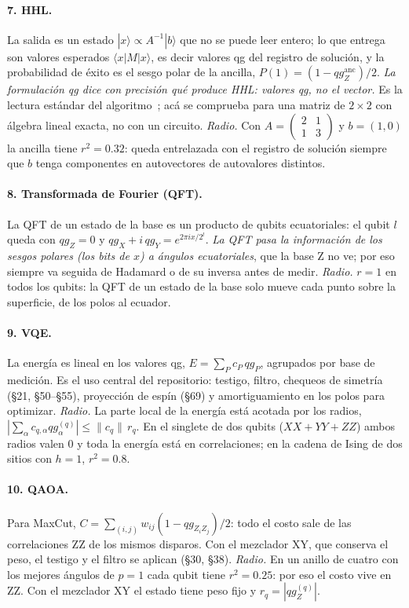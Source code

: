 \documentclass[11pt]{article}
\newcommand{\q}[1]{qg_{#1}}
\newcommand{\qZ}{qg_Z}
\newcommand{\qX}{qg_X}
\newcommand{\qY}{qg_Y}
\begin{document}
\paragraph{7. HHL.} La salida es un estado $|x\rangle\propto A^{-1}|b\rangle$ que no se puede leer entero; lo
que entrega son valores esperados $\langle x|M|x\rangle$, es decir valores qg del registro de solución, y la
probabilidad de éxito es el sesgo polar de la ancilla, $P(1)=(1-\qZ^{\mathrm{anc}})/2$. \emph{La formulación qg
dice con precisión qué produce HHL: valores qg, no el vector.} Es la lectura estándar del algoritmo~\cite{nielsen2010quantum}; acá se
comprueba para una matriz de $2\times2$ con álgebra lineal exacta, no con un circuito. \emph{Radio.} Con
$A=\begin{pmatrix}2&1\\1&3\end{pmatrix}$ y $b=(1,0)$ la ancilla tiene $r^2=0.32$: queda entrelazada con el registro
de solución siempre que $b$ tenga componentes en autovectores de autovalores distintos.

\paragraph{8. Transformada de Fourier (QFT).} La QFT de un estado de la base es un producto de qubits
ecuatoriales: el qubit $l$ queda con $\qZ=0$ y $\qX+i\,\qY=e^{2\pi i x/2^l}$. \emph{La QFT pasa la
información de los sesgos polares (los bits de $x$) a ángulos ecuatoriales}, que la base Z no ve; por eso
siempre va seguida de Hadamard o de su inversa antes de medir. \emph{Radio.} $r=1$ en todos los qubits: la QFT de
un estado de la base solo mueve cada punto sobre la superficie, de los polos al ecuador.

\paragraph{9. VQE.} La energía es lineal en los valores qg, $E=\sum_P c_P\,\q{P}$, agrupados por base de
medición. Es el uso central del repositorio: testigo, filtro, chequeos de simetría (§21, §50--§55), proyección
de espín (§69) y amortiguamiento en los polos para optimizar. \emph{Radio.} La parte local de la energía está acotada por
los radios, $|\sum_\alpha c_{q,\alpha}\q{\alpha}^{(q)}|\le\|c_q\|\,r_q$. En el singlete de dos qubits ($XX+YY+ZZ$)
ambos radios valen 0 y toda la energía está en correlaciones; en la cadena de Ising de dos sitios con $h=1$,
$r^2=0.8$.

\paragraph{10. QAOA.} Para MaxCut, $C=\sum_{(i,j)}w_{ij}(1-\q{Z_iZ_j})/2$: todo el costo sale de las
correlaciones ZZ de los mismos disparos. Con el mezclador XY, que conserva el peso, el testigo y el filtro
se aplican (§30, §38). \emph{Radio.} En un anillo de cuatro con los mejores ángulos de $p=1$ cada qubit tiene $r^2=0.25$:
por eso el costo vive en ZZ. Con el mezclador XY el estado tiene peso fijo y $r_q=|\qZ^{(q)}|$.
\end{document}
